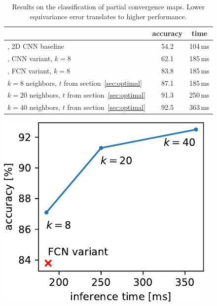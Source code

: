 \documentclass{article} %
\newcommand{\secref}[1]{section~\ref{sec:#1}}
\begin{document}
\begin{table}
	\begin{minipage}[b]{0.7\linewidth}
    \centering
    \begin{tabular}{l c c}
		\toprule
		& accuracy & time \\ %
		\midrule
		\citet{perraudin2019deepspherecosmo}, 2D CNN baseline & 54.2 & 104\,ms \\
		\citet{perraudin2019deepspherecosmo}, CNN variant, $k=8$ & 62.1 & 185\,ms \\ %
		\citet{perraudin2019deepspherecosmo}, FCN variant, $k=8$ & 83.8 & 185\,ms \\ %
		$k=8$  neighbors, $t$ from \secref{optimal} & 87.1 & 185\,ms \\ %
		$k=20$ neighbors, $t$ from \secref{optimal} & 91.3 & 250\,ms \\ %
		$k=40$ neighbors, $t$ from \secref{optimal} & 92.5 & 363\,ms \\ %
		\bottomrule
    \end{tabular}
	\caption{
		Results on the classification of partial convergence maps.
		Lower equivariance error translates to higher performance.
	} \label{tab:cosmo}
	\end{minipage} \hfill
	\begin{minipage}[b]{0.25\linewidth}
		\includegraphics[width=\linewidth]{cosmo_cost_accuracy_tradeoff}
		\label{fig:cosmo:tradeoff}
	\end{minipage}
\end{table}
\end{document}
